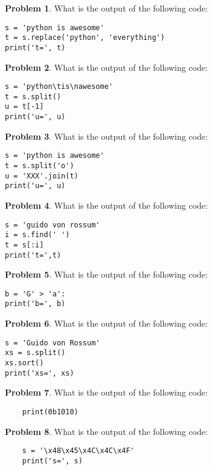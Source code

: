 \documentclass[10pt]{article}
\theoremstyle{definition}
\newtheorem{problem}{Problem}
\newcommand{\x}{\mathbf x}
\begin{document}
\newpage
\begin{problem}
    What is the output of the following code:
\end{problem}
\begin{lstlisting}
s = 'python is awesome'
t = s.replace('python', 'everything')
print('t=', t)
\end{lstlisting}
\vspace{1.5in}

\begin{problem}
    What is the output of the following code:
\end{problem}
\begin{lstlisting}
s = 'python\tis\nawesome'
t = s.split()
u = t[-1]
print('u=', u)
\end{lstlisting}
\vspace{1.5in}

\begin{problem}
    What is the output of the following code:
\end{problem}
\begin{lstlisting}
s = 'python is awesome'
t = s.split('o')
u = 'XXX'.join(t)
print('u=', u)
\end{lstlisting}
\vspace{1.5in}

\newpage
\begin{problem}
    What is the output of the following code:
\end{problem}
\begin{lstlisting}
s = 'guido von rossum'
i = s.find(' ')
t = s[:i]
print('t=',t)
\end{lstlisting}
\vspace{1.5in}

\begin{problem}
    What is the output of the following code:
\end{problem}
\begin{lstlisting}
b = 'G' > 'a':
print('b=', b)
\end{lstlisting}
\vspace{1.5in}


\begin{problem}
    What is the output of the following code:
\end{problem}
\begin{lstlisting}
s = 'Guido von Rossum'
xs = s.split()
xs.sort()
print('xs=', xs)
\end{lstlisting}
\vspace{1.5in}


\newpage
\begin{problem}
    What is the output of the following code:
\end{problem}
\begin{lstlisting}
    print(0b1010)
\end{lstlisting}
\vspace{1.5in}


\begin{problem}
    What is the output of the following code:
\end{problem}
\begin{lstlisting}
    s = '\x48\x45\x4C\x4C\x4F'
    print('s=', s)
\end{lstlisting}
\vspace{1.5in}
\end{document}
